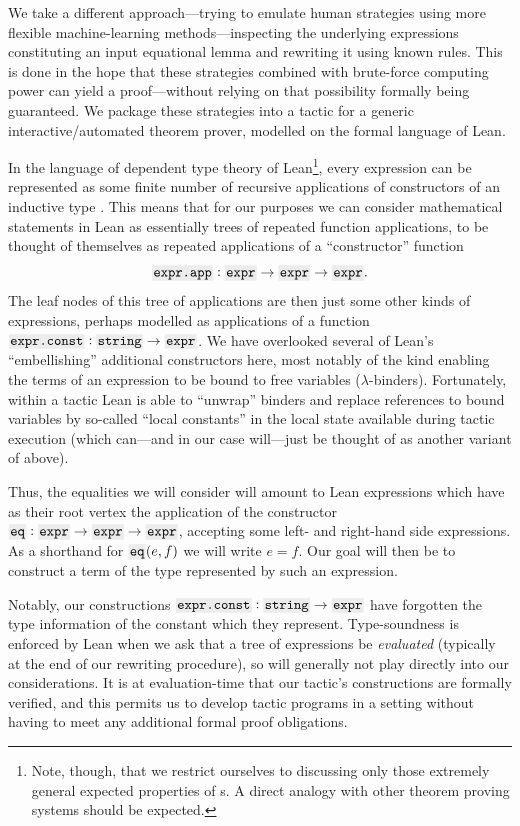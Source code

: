 \documentclass[12pt]{article}
\begin{document}
We take a different approach---trying to emulate human strategies using more flexible machine-learning methods---inspecting the underlying expressions constituting an input equational lemma and rewriting it using known rules. This is done in the hope that these strategies combined with brute-force computing power can yield a proof---without relying on that possibility formally being guaranteed. We package these strategies into a tactic for a generic interactive/automated theorem prover, modelled on the formal language of Lean.

In the language of dependent type theory of Lean\footnote{Note, though, that we restrict ourselves to discussing only those extremely general expected properties of \expr{}s. A direct analogy with other theorem proving systems should be expected.}, every expression can be represented as some finite number of recursive applications of constructors of an inductive type \expr{}. This means that for our purposes we can consider mathematical statements in Lean as essentially trees of repeated function applications, to be thought of themselves as repeated applications of a ``constructor'' function
\begin{equation*}
  \xx{expr.app} : \expr{} \to \expr{} \to \expr{}.
\end{equation*}
The leaf nodes of this tree of applications are then just some other kinds of expressions, perhaps modelled as applications of a function $\xx{expr.const} : \xx{string} \to \expr{}$. We have overlooked several of Lean's ``embellishing'' additional  constructors here, most notably of the kind enabling the terms of an expression to be bound to free variables ($\lambda$-binders). Fortunately, within a tactic Lean is able to ``unwrap'' binders and replace references to bound variables by so-called ``local constants'' in the local state available during tactic execution (which can---and in our case will---just be thought of as another variant of  above).

Thus, the equalities we will consider will amount to Lean expressions which have as their root vertex the application of the constructor $\xx{eq} : \expr{} \to \expr{} \to \expr{}$, accepting some left- and right-hand side expressions. As a shorthand for $\xx{eq}(e, f)$ we will write $e = f$. Our goal will then be to construct a term of the type represented by such an expression.

Notably, our constructions $\xx{expr.const} : \xx{string} \to \expr{}$ have forgotten the type information of the constant which they represent. Type-soundness is enforced by Lean when we ask that a tree of expressions be \textit{evaluated} (typically at the end of our rewriting procedure), so will generally not play directly into our considerations. It is at evaluation-time that our tactic's constructions are formally verified, and this permits us to develop tactic programs in a setting without having to meet any additional formal proof obligations.
\end{document}
